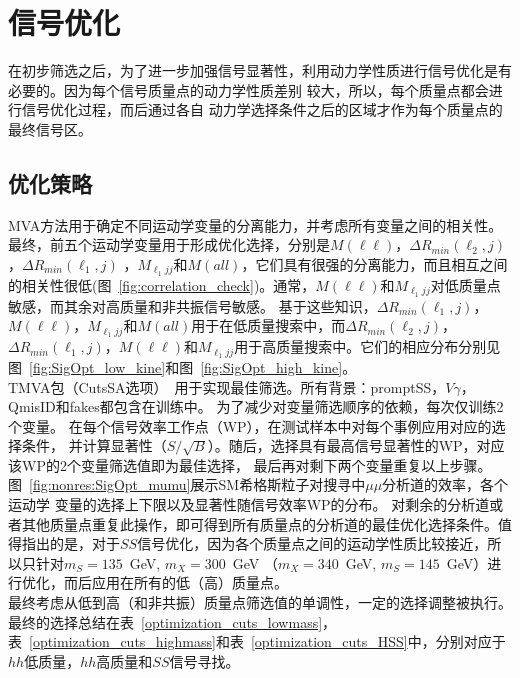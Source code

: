 \section{信号优化}\label{sec:signal_optimization}
在初步筛选之后，为了进一步加强信号显著性，利用动力学性质进行信号优化是有必要的。因为每个信号质量点的动力学性质差别
较大，所以，每个质量点都会进行信号优化过程，而后通过各自
动力学选择条件之后的区域才作为每个质量点的最终信号区。

\subsection{优化策略}
MVA方法用于确定不同运动学变量的分离能力，并考虑所有变量之间的相关性。最终，前五个运动学变量用于形成优化选择，分别是$M(\ell\ell)$，$\Delta R_{min}(\ell_{2}, j)$，$\Delta R_{min}(\ell_{1}, j)$ ，$ M_{\ell_{1} jj}$和$M(all)$，它们具有很强的分离能力，而且相互之间的相关性很低(图~\ref{fig:correlation_check})。通常，$M(\ell\ell)$和$ M_{\ell_{1} jj} $对低质量点敏感，而其余对高质量和非共振信号敏感。
基于这些知识，$\Delta R_{min}(\ell_{1}, j)$，$M(\ell\ell)$，$ M_{\ell_{1}jj}$和$M(all)$用于在低质量搜索中，而$\Delta R_{min}(\ell_{2}, j)$，$\Delta R_{min}(\ell_{1}, j)$，$M(\ell\ell)$和$M_{\ell_{1}jj}$用于高质量搜索中。它们的相应分布分别见图~\ref{fig:SigOpt_low_kine}和图~\ref{fig:SigOpt_high_kine}。\\
TMVA包（CutsSA选项）~\cite{Hocker:2007ht}用于实现最佳筛选。所有背景：promptSS，$V\gamma$，QmisID和fakes都包含在训练中。
为了减少对变量筛选顺序的依赖，每次仅训练2个变量。
在每个信号效率工作点（WP），在测试样本中对每个事例应用对应的选择条件，
并计算显著性（$S/\sqrt{B}$）。随后，选择具有最高信号显著性的WP，对应该WP的2个变量筛选值即为最佳选择，
最后再对剩下两个变量重复以上步骤。图~\ref{fig:nonres:SigOpt_mumu}展示SM希格斯粒子对搜寻中$\mu\mu$分析道的效率，各个运动学
变量的选择上下限以及显著性随信号效率WP的分布。
对剩余的分析道或者其他质量点重复此操作，即可得到所有质量点的分析道的最佳优化选择条件。值得指出的是，对于$SS$信号优化，因为各个质量点之间的运动学性质比较接近，所以只针对$m_S=135$~GeV, $m_X=300$~GeV （$m_X=340$~GeV, $m_S=145$~GeV）进行优化，而后应用在所有的低（高）质量点。 \\
最终考虑从低到高（和非共振）质量点筛选值的单调性，一定的选择调整被执行。最终的选择总结在表~\ref{optimization_cuts_lowmass}，表~\ref {optimization_cuts_highmass}和表~\ref{optimization_cuts_HSS}中，分别对应于$hh$低质量，$hh$高质量和$SS$信号寻找。

